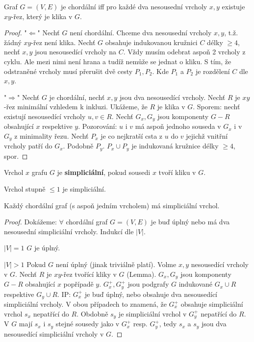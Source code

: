 \begin{lemma}
	Graf $G= (V,E)$ je chordální iff pro každé dva nesousední vrcholy $x,y$ existuje $xy$-řez, který je klika v $G$.
\end{lemma}

\begin{proof}
	"$\Leftarrow$" Nechť $G$ není chordální. Chceme dva nesousední vrcholy $x,y$, t.ž. žádný $xy$-řez není klika. Nechť $G$ obsahuje indukovanou kružnici $C$ délky $\geq 4$, nechť $x,y$ jsou nesousedící vrcholy na $C$. Vždy musím odebrat aspoň 2 vrcholy z cyklu. Ale mezi nimi není hrana a tudíž nemůže se jednat o kliku. S tím, že odstraněné vrcholy musí přerušit dvě cesty $P_{1}, P_{2}$. Kde $P_{1}$ a $P_{2}$ je rozdělení $C$ dle $x,y$.
	
	"$\Rightarrow$" Nechť $G$ je chordální, nechť $x,y$ jsou dva nesousedící vrcholy. Nechť $R$ je $xy$-řez minimální vzhledem k inkluzi. Ukážeme, že $R$ je klika v $G$. Sporem: nechť existují nesousedící vrcholy $u,v \in R$. Nechť $G_{x}, G_{y}$ jsou komponenty $G-R$ obsahující $x$ respektive $y$. Pozorování: $u$ i $v$ má aspoň jednoho souseda v $G_{x}$ i v $G_{y}$ z minimality řezu. Nechť $P_{x}$ je co nejkratší csta z $u$ do $v$ jejichž vnitřní vrcholy patří do $G_{x}$. Podobně $P_{y}$. $P_{x} \cup P_{y}$ je indukovaná kružnice délky $\geq 4$, spor.
\end{proof}

\begin{definice}
	Vrchol $x$ grafu $G$ je \textbf{simpliciální}, pokud sousedi $x$ tvoří kliku v $G$.
\end{definice}

\begin{pozor}
	Vrchol stupně $\leq 1$ je simpliciální.
\end{pozor}

\begin{lemma}
	Každý chordální graf (s aspoň jedním vrcholem) má simpliciální vrchol.
\end{lemma}

\begin{proof}
	Dokážeme: $\forall$ chordální graf $G = (V,E)$ je buď úplný nebo má dva nesousední simpliciální vrcholy. Indukcí dle $|V|$.
	
	$|V|=1$ $G$ je úplný.
	
	$|V|>1$ Pokud $G$ není úplný (jinak triviálně platí). Volme $x,y$ nesousedící vrcholy v $G$. Nechť $R$ je $xy$-řez tvořící kliky v $G$ (Lemma). $G_{x}, G_{y}$ jsou komponenty $G-R$ obsahující $x$ popřípadě $y$. $G_{x}^{+},G_{y}^{+}$ jsou podgrafy $G$ indukované $G_{x} \cup R$ respektive $G_{y} \cup R$. IP: $G_{x}^{+}$ je buď úplný, nebo obsahuje dva nesousedící simpliciální vrcholy. V obou případech to znamená, že $G_{x}^{+}$ obsahuje simpliciální vrchol $s_{x}$ nepatřící do $R$. Obdobně $s_{y}$ je simpliciální vrchol v $G_{y}^{+}$ nepatřící do $R$. V $G$ mají $s_{x}$ i $s_{y}$ stejné sousedy jako v $G_{x}^{+}$ resp. $G_{y}^{+}$, tedy $s_{x}$ a $s_{y}$ jsou dva nesousedící simpliciální vrcholy v $G$.
\end{proof}

